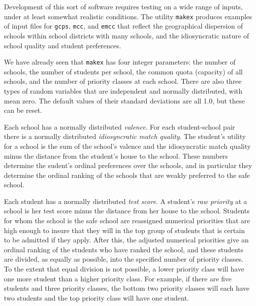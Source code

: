 \documentclass[12pt]{article}
\theoremstyle{definition}
\begin{document}
Development of this sort of software requires testing on a wide range
of inputs, under at least somewhat realistic conditions.  The utility
\texttt{makex} produces examples of input files for \texttt{gcps},
\texttt{mcc}, and \texttt{emcc} that reflect the geographical
dispersion of schools within school districts with many schools, and
the idiosyncratic nature of school quality and student preferences.

We have already seen that \texttt{makex} has four integer parameters:
the number of schools, the number of students per school, the common
quota (capacity) of all schools, and the number of priority classes at
each school.  There are also three types of random variables that are
independent and normally distributed, with mean zero.  The default
values of their standard deviations are all 1.0, but these can be
reset.

Each school has a normally distributed \emph{valence}.  For each
student-school pair there is a normally distributed
\emph{idiosyncratic match quality}.  The student's utility for a
school is the sum of the school's valence and the idiosyncratic match
quality minus the distance from the student's house to the school.
These numbers determine the sudent's ordinal preferences over the
schools, and in particular they determine the ordinal ranking of the
schools that are weakly preferred to the safe school.

Each student has a normally distributed \emph{test score}.  A
student's \emph{raw priority} at a school is her test score minus the
distance from her house to the school.  Students for whom the school
is the safe school are reassigned numerical priorities that are high
enough to insure that they will in the top group of students that is
certain to be admitted if they apply.  After this, the adjusted
numerical priorities give an ordinal ranking of the students who have
ranked the school, and these students are divided, as equally as
possible, into the specified number of priority classes.  To the
extent that equal division is not possible, a lower priority class
will have one more student than a higher priority class.  For example,
if there are five students and three priority classes, the bottom two
priority classes will each have two students and the top priority
class will have one student.
\end{document}
